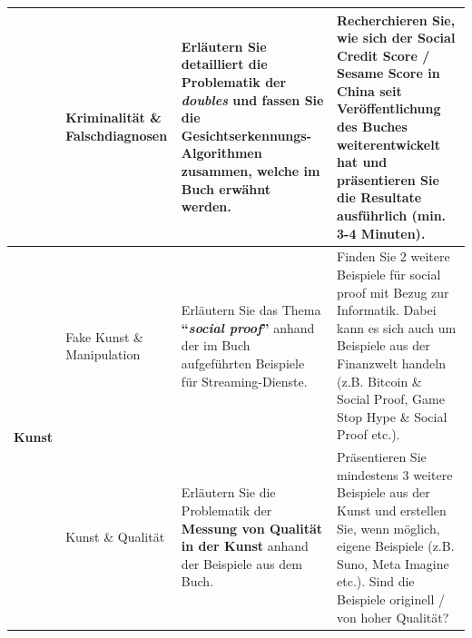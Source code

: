 \begin{landscape}
\begin{longtable}{@{}r|p{5.3cm}||p{10cm}|p{10cm}@{}}
		                              & Kriminalität \& Falschdiagnosen       & Erläutern Sie detailliert die Problematik der \textit{\textbf{doubles}} und fassen Sie die \textbf{Gesichtserkennungs-Algorithmen} zusammen, welche im Buch erwähnt werden.                                                                                                                                                                                                                            & Recherchieren Sie, wie sich der Social Credit Score / Sesame Score in China seit Veröffentlichung des Buches weiterentwickelt hat und präsentieren Sie die Resultate ausführlich (min. 3-4 Minuten).                                                                             \\\midrule\midrule
		\multirow{2}{*}{\textbf{Kunst}}        & Fake Kunst \& Manipulation            & Erläutern Sie das Thema \textbf{``\textit{social proof}''} anhand der im Buch aufgeführten Beispiele für Streaming-Dienste.                                                                                                                                                                                                                                                          & Finden Sie 2 weitere Beispiele für social proof mit Bezug zur Informatik. Dabei kann es sich auch um Beispiele aus der Finanzwelt handeln (z.B. Bitcoin \& Social Proof, Game Stop Hype \& Social Proof etc.).                                                                   \\\cmidrule(l){2-4}
		                              & Kunst \& Qualität                     & Erläutern Sie die Problematik der \textbf{Messung von Qualität in der Kunst} anhand der Beispiele aus dem Buch.                                                                                                                                                                                                                                                                      & Präsentieren Sie mindestens 3 weitere Beispiele aus der Kunst und erstellen Sie, wenn möglich, eigene Beispiele (z.B. Suno, Meta Imagine etc.). Sind die Beispiele originell / von hoher Qualität?                                                                               \\
	\end{longtable}

\end{landscape}


